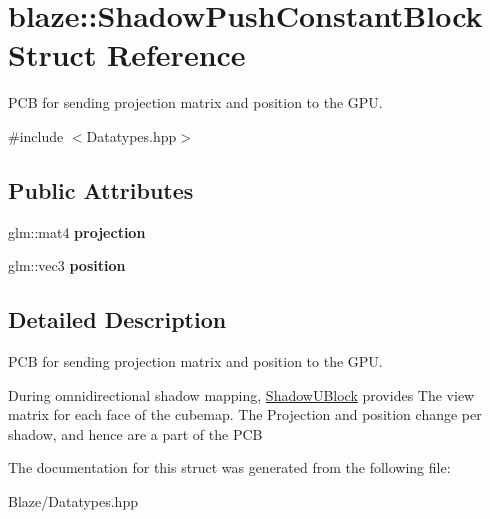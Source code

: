 \hypertarget{structblaze_1_1ShadowPushConstantBlock}{}\section{blaze\+:\+:Shadow\+Push\+Constant\+Block Struct Reference}
\label{structblaze_1_1ShadowPushConstantBlock}


P\+CB for sending projection matrix and position to the G\+PU.  




{\ttfamily \#include $<$Datatypes.\+hpp$>$}

\subsection*{Public Attributes}
\begin{DoxyCompactItemize}
\item 
\mbox{\label{structblaze_1_1ShadowPushConstantBlock_af459f4655cc68b9394867648fcb48fb9}} 
glm\+::mat4 {\bfseries projection}
\item 
\mbox{\label{structblaze_1_1ShadowPushConstantBlock_a2215b39c0cbb7d737a98702e28f07032}} 
glm\+::vec3 {\bfseries position}
\end{DoxyCompactItemize}


\subsection{Detailed Description}
P\+CB for sending projection matrix and position to the G\+PU. 

During omnidirectional shadow mapping, \hyperlink{structblaze_1_1ShadowUBlock}{Shadow\+U\+Block} provides The view matrix for each face of the cubemap. The Projection and position change per shadow, and hence are a part of the P\+CB 

The documentation for this struct was generated from the following file\+:\begin{DoxyCompactItemize}
\item 
Blaze/Datatypes.\+hpp\end{DoxyCompactItemize}
